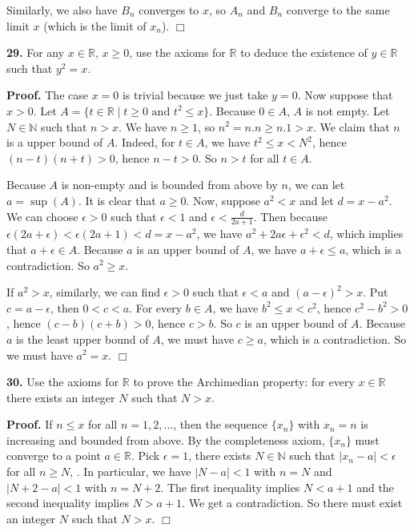 \documentclass{article}
\begin{document}
Similarly, we also have $B_n$ converges to $x$, so $A_n$ and $B_n$
converge to the same limit $x$ (which is the limit of $x_n$). $\Box$

    \textbf{29.} For any $x\in \mathbb{R}$, $x\geq 0$, use the axioms for
$\mathbb{R}$ to deduce the existence of $y\in \mathbb{R}$ such that
$y^2 = x$.

\textbf{Proof.} The case $x=0$ is trivial because we just take $y=0$.
Now suppose that $x > 0$. Let
$A = \{t\in \mathbb{R} \mid t \ge 0 \text{ and } t^2 \leq x\}$. Because
$0\in A$, $A$ is not empty. Let $N \in \mathbb{N}$ such that $n > x$. We
have $n \ge 1$, so $n^2 =n.n \ge n.1 > x$. We claim that $n$ is a upper
bound of $A$. Indeed, for $t\in A$, we have $t^2 \le x < N^2$, hence
$(n-t)(n+t) > 0$, hence $n - t > 0$. So $n > t$ for all $t \in A$.

Because $A$ is non-empty and is bounded from above by $n$, we can let
$a = \sup(A)$. It is clear that $a \geq 0$. Now, suppose $a^2 < x$ and
let $d = x - a^2$. We can choose $\epsilon > 0$ such that $\epsilon < 1$
and $\epsilon < \frac{d}{2a+1}$. Then because
$\epsilon(2a+\epsilon) < \epsilon(2a +1) < d = x-a^2$, we have
$a^2 + 2a \epsilon + \epsilon^2 < d$, which implies that
$a + \epsilon \in A$. Because $a$ is an upper bound of $A$, we have
$a + \epsilon \le a$, which is a contradiction. So $a^2 \geq x$.

If $a^2 > x$, similarly, we can find $\epsilon > 0$ such that
$\epsilon < a$ and $(a-\epsilon)^2 > x$. Put $c = a-\epsilon$, then
$0 < c < a$. For every $b \in A$, we have $b^2 \le x < c^2$, hence
$c^2 - b^2 > 0$, hence $(c-b)(c+b) > 0$, hence $c > b$. So $c$ is an
upper bound of $A$. Because $a$ is the least upper bound of $A$, we must
have $c \ge a$, which is a contradiction. So we must have $a^2 = x$.
$\Box$

    \textbf{30.} Use the axioms for $\mathbb{R}$ to prove the Archimedian
property: for every $x\in \mathbb{R}$ there exists an integer $N$ such
that $N > x$.

\textbf{Proof.} If $n \leq x$ for all $n = 1,2,\ldots$, then the
sequence $\{x_n\}$ with $x_n = n$ is increasing and bounded from above.
By the completeness axiom, $\{x_n\}$ must converge to a point
$a\in \mathbb{R}$. Pick $\epsilon = 1$, there exists $N\in \mathbb{N}$
such that $|x_n - a| < \epsilon$ for all $n \geq N$, . In particular, we
have $|N - a| < 1$ with $n= N$ and $|N+2 - a| < 1$ with $n=N+2$. The
first inequality implies $N < a + 1$ and the second inequality implies
$N > a + 1$. We get a contradiction. So there must exist an integer $N$
such that $N > x$. $\Box$
\end{document}
